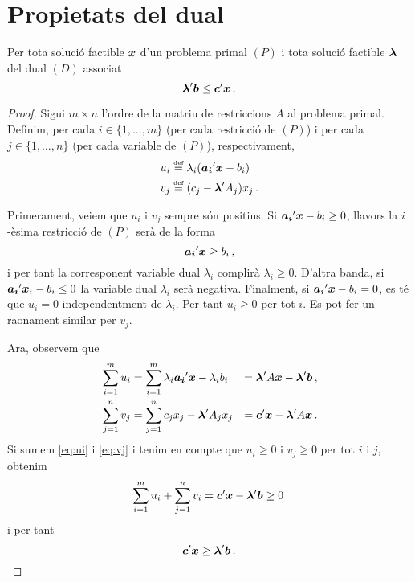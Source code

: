 \section{Propietats del dual}
\begin{teo}\label{teo:dualitat-feble}
	Per tota solució factible $\boldsymbol{x}$ d'un problema primal $\left(P\right)$ i
	tota solució factible $\boldsymbol{\lambda}$ del dual $\left(D\right)$ associat
	\[ \boldsymbol{\lambda}'\boldsymbol{b}\leq \boldsymbol{c}'\boldsymbol{x}\,. \]
	\begin{proof}
		Sigui $m\times n$ l'ordre de la matriu de restriccions $A$ al problema
		primal. Definim, per cada $i\in\{1,\ldots,m\}$ (per cada restricció de 
		$(P)$) i
		per cada $j\in\{1,\ldots,n\}$ (per cada variable de $(P)$), 
		respectivament, 
		\begin{align*}
		u_i &\stackrel{\text{\tiny def}}{=} {{\lambda}}_i(\boldsymbol{\boldsymbol{a_i}}'\boldsymbol{\boldsymbol{x}}-b_i)\\
		v_j &\stackrel{\text{\tiny def}}{=} (c_j - \boldsymbol{\boldsymbol{\lambda}}'A_j)x_j\,.
		\end{align*}
		
		Primerament, veiem que $u_i$ i $v_j$ sempre són positius. Si
		$\boldsymbol{\boldsymbol{a_i}}'\boldsymbol{\boldsymbol{x}}-b_i \ge 0$, llavors la $i$-èsima restricció 
		de $(P)$
		serà de la forma \[\boldsymbol{\boldsymbol{a_i}}'\boldsymbol{\boldsymbol{x}} \ge b_i\,,\] i per tant la
		corresponent variable dual $\lambda_i$ complirà $\lambda_i \ge 0$. 
		D'altra
		banda, si $\boldsymbol{\boldsymbol{a_i}}'\boldsymbol{\boldsymbol{x}}_i-b_i \le 0$ la variable dual 
		$\lambda_i$
		serà negativa. Finalment, si $\boldsymbol{\boldsymbol{a_i}}'\boldsymbol{\boldsymbol{x}}-b_i = 0$, es té 
		que $u_i
		= 0$ independentment de $\lambda_i$. Per tant $u_i \ge 0$ per tot $i$. 
		Es pot
		fer un raonament similar per $v_j$.
		
		Ara, observem que
		\begin{alignat}{2}{}
		\sum_{i = 1}^{m} u_i &= \sum_{i = 1}^{m}
		\lambda_i\boldsymbol{\boldsymbol{a_i}}'\boldsymbol{\boldsymbol{x}}-\lambda_ib_i &=
		\boldsymbol{\boldsymbol{\lambda}}'A\boldsymbol{\boldsymbol{x}} - \boldsymbol{\boldsymbol{\lambda}}'\boldsymbol{b}\,, 
		\label{eq:ui}\\
		\sum_{j = 1}^{n} v_j &= \sum_{j = 1}^{n} c_jx_j - 
		\boldsymbol{\boldsymbol{\lambda}}'A_jx_j
		&= \boldsymbol{\boldsymbol{c}}'\boldsymbol{\boldsymbol{x}} - \boldsymbol{\boldsymbol{\lambda}}'A\boldsymbol{\boldsymbol{x}}\,. 
		\label{eq:vj}
		\end{alignat}
		Si sumem \eqref{eq:ui} i \eqref{eq:vj} i tenim en compte que $u_i \ge 
		0$ i
		$v_j \ge 0$ per tot $i$ i $j$, obtenim
		\begin{equation}\label{eq:sum-ui-vj}
		\sum_{i = 1}^{m} u_i + \sum_{j = 1}^{n} v_i=
		\boldsymbol{\boldsymbol{c}}'\boldsymbol{\boldsymbol{x}}-\boldsymbol{\boldsymbol{\lambda}}'\boldsymbol{b} \ge 0\,
		\end{equation}
		i per tant \[\boldsymbol{\boldsymbol{c}}'\boldsymbol{\boldsymbol{x}} \ge \boldsymbol{\boldsymbol{\lambda}}'\boldsymbol{b}\,.\]
	\end{proof}
\end{teo}
